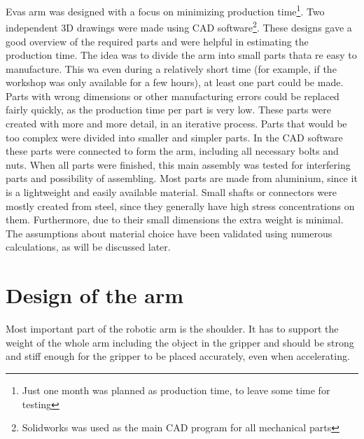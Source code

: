 \documentclass[technical_document.tex]{subfiles}
\begin{document}
Eva\textquotesingle{}s arm was designed with a focus on minimizing production time\footnote{Just one month was planned as production time, to leave some time for testing}. %
Two independent 3D drawings were made using CAD software\footnote{Solidworks was used as the main CAD program for all mechanical parts}. These designs gave a good overview of the required parts and were helpful in estimating the production time. The idea was to divide the arm into small parts thata re easy to manufacture. This wa even during a relatively short time (for example, if the workshop was only available for a few hours), at least one part could be made. Parts with wrong dimensions or other manufacturing errors could be replaced fairly quickly, as the production time per part is very low. 
These parts were created with more and more detail, in an iterative process. Parts that would be too complex were divided into smaller and simpler parts. In the CAD software these parts were connected to form the arm, including all necessary bolts and nuts. When all parts were finished, this main assembly was tested for interfering parts and possibility of assembling. Most parts are made from aluminium, since it is a lightweight and easily available material. Small shafts or connectors were mostly created from steel, since they generally have high stress concentrations on them. Furthermore, due to their small dimensions the extra weight is minimal. The assumptions about material choice have been validated using numerous calculations, as will be discussed later.

\section{Design of the arm}

Most important part of the robotic arm is the shoulder. It has to support the weight of the whole arm including the object in the gripper and should be strong and stiff enough for the gripper to be placed accurately, even when accelerating.
\end{document}
